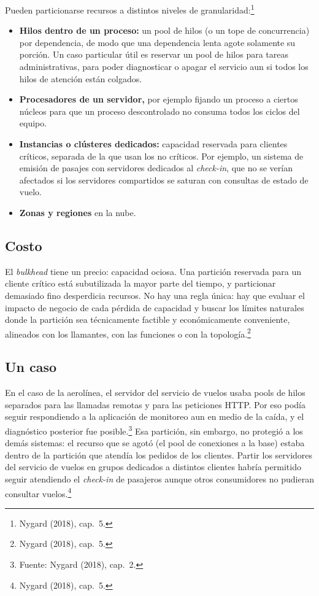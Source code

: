 \documentclass[variant=apuntes,cover=institutional,mode=screen]{ua-engineering-v6-article}
\begin{document}
Pueden particionarse recursos a distintos niveles de granularidad:\footnote{Nygard (2018), cap.~5.}
\begin{itemize}
\item \textbf{Hilos dentro de un proceso:} un pool de hilos (o un tope de concurrencia) por dependencia, de modo que una dependencia lenta agote solamente su porción. Un caso particular útil es reservar un pool de hilos para tareas administrativas, para poder diagnosticar o apagar el servicio aun si todos los hilos de atención están colgados.
\item \textbf{Procesadores de un servidor,} por ejemplo fijando un proceso a ciertos núcleos para que un proceso descontrolado no consuma todos los ciclos del equipo.
\item \textbf{Instancias o clústeres dedicados:} capacidad reservada para clientes críticos, separada de la que usan los no críticos. Por ejemplo, un sistema de emisión de pasajes con servidores dedicados al \emph{check-in}, que no se verían afectados si los servidores compartidos se saturan con consultas de estado de vuelo.
\item \textbf{Zonas y regiones} en la nube.
\end{itemize}

\subsection{Costo}

El \emph{bulkhead} tiene un precio: capacidad ociosa. Una partición reservada para un cliente crítico está subutilizada la mayor parte del tiempo, y particionar demasiado fino desperdicia recursos. No hay una regla única: hay que evaluar el impacto de negocio de cada pérdida de capacidad y buscar los límites naturales donde la partición sea técnicamente factible y económicamente conveniente, alineados con los llamantes, con las funciones o con la topología.\footnote{Nygard (2018), cap.~5.}

\subsection{Un caso}

En el caso de la aerolínea, el servidor del servicio de vuelos usaba pools de hilos separados para las llamadas remotas y para las peticiones HTTP. Por eso podía seguir respondiendo a la aplicación de monitoreo aun en medio de la caída, y el diagnóstico posterior fue posible.\footnote{\historiaaerolinea{} Fuente: Nygard (2018), cap.~2.} Esa partición, sin embargo, no protegió a los demás sistemas: el recurso que se agotó (el pool de conexiones a la base) estaba dentro de la partición que atendía los pedidos de los clientes. Partir los servidores del servicio de vuelos en grupos dedicados a distintos clientes habría permitido seguir atendiendo el \emph{check-in} de pasajeros aunque otros consumidores no pudieran consultar vuelos.\footnote{Nygard (2018), cap.~5.}
\end{document}

